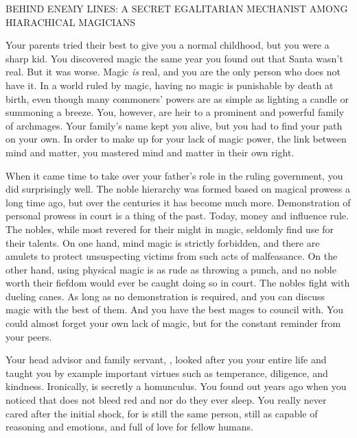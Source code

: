 \documentclass[char]{guildcamp3}
\begin{document}
\name{\cNobleOne{}}




BEHIND ENEMY LINES: A SECRET EGALITARIAN MECHANIST AMONG HIARACHICAL MAGICIANS

Your parents tried their best to give you a normal childhood, but you were a sharp kid. You discovered magic the same year you found out that Santa wasn't real. But it was worse. Magic \emph{is} real, and you are the only person who does not have it. In a world ruled by magic, having no magic is punishable by death at birth, even though many commoners' powers are as simple as lighting a candle or summoning a breeze. You, however, are heir to a prominent and powerful family of archmages. Your family's name kept you alive, but you had to find your path on your own. In order to make up for your lack of magic power, the link between mind and matter, you mastered mind and matter in their own right.

When it came time to take over your father's role in the ruling government, you did surprisingly well. The noble hierarchy was formed based on magical prowess a long time ago, but over the centuries it has become much more. Demonstration of personal prowess in court is a thing of the past. Today, money and influence rule. The nobles, while most revered for their might in magic, seldomly find use for their talents. On one hand, mind magic is strictly forbidden, and there are amulets to protect unsuspecting victims from such acts of malfeasance. On the other hand, using physical magic is as rude as throwing a punch, and no noble worth their fiefdom would ever be caught doing so in court. The nobles fight with dueling canes. As long as no demonstration is required, and you can discuss magic with the best of them. And you have the best mages to council with. You could almost forget your own lack of magic, but for the constant reminder from your peers.

Your head advisor and family servant, \cServant{\intro}, looked after you your entire life and taught you by example important virtues such as temperance, diligence, and kindness. Ironically,  is secretly a homunculus. You found out years ago when you noticed that  does not bleed red and nor do they ever sleep. You really never cared after the initial shock, for  is still the same person, still as capable of reasoning and emotions, and full of love for  fellow humans.
\end{document}
